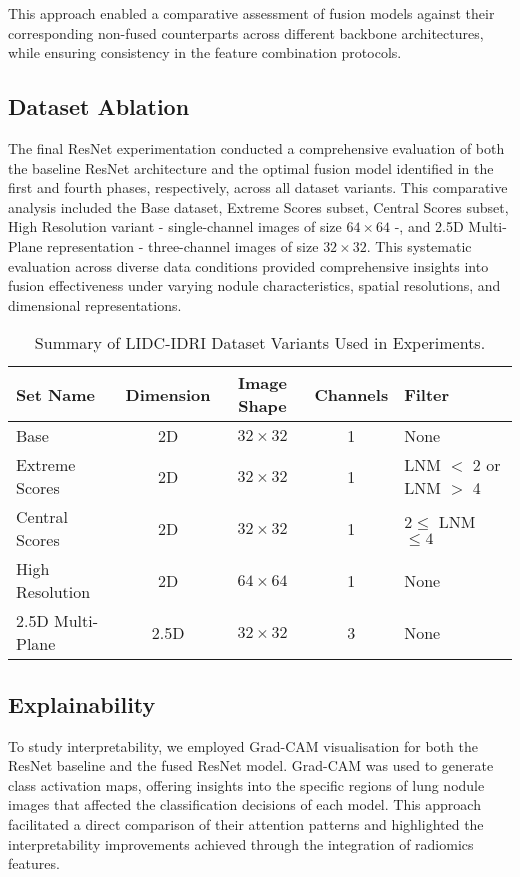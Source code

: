 This approach enabled a comparative assessment of fusion models against their corresponding non-fused counterparts across different backbone architectures, while ensuring consistency in the feature combination protocols.



\subsection{Dataset Ablation}

The final ResNet experimentation conducted a comprehensive evaluation of both the baseline ResNet architecture and the optimal fusion model identified in the first and fourth phases, respectively, across all dataset variants. This comparative analysis included the Base dataset, Extreme Scores subset, Central Scores subset, High Resolution variant - single-channel images of size $64 \times 64$ -, and 2.5D Multi-Plane representation - three-channel images of size $32\times32$. This systematic evaluation across diverse data conditions provided comprehensive insights into fusion effectiveness under varying nodule characteristics, spatial resolutions, and dimensional representations.


\begin{table}[htbp]
\centering
\caption{Summary of LIDC-IDRI Dataset Variants Used in Experiments.}
\begin{tabular}{lcccl}
        \toprule
        \textbf{Set Name} & \textbf{Dimension} & \textbf{Image Shape} & \textbf{Channels} & \textbf{Filter} \\
        \midrule
        Base & 2D   & $32 \times 32$    & 1 & None \\
        Extreme Scores & 2D & $32 \times 32$    & 1 & LNM $<$ 2 or LNM $>$ 4 \\
        Central Scores  & 2D & $32 \times 32$    & 1 & $2 \leq$ LNM $\leq 4$ \\
        High Resolution & 2D & $64 \times 64$    & 1 & None \\
        2.5D Multi-Plane & 2.5D & $32 \times 32$    & 3 & None \\
        \bottomrule
    \end{tabular}
    \label{tab:dataset_variants}
\end{table}

\FloatBarrier

\subsection{Explainability}
To study interpretability, we employed Grad-CAM visualisation for both the ResNet baseline and the fused ResNet model. Grad-CAM was used to generate class activation maps, offering insights into the specific regions of lung nodule images that affected the classification decisions of each model. This approach facilitated a direct comparison of their attention patterns and highlighted the interpretability improvements achieved through the integration of radiomics features.

